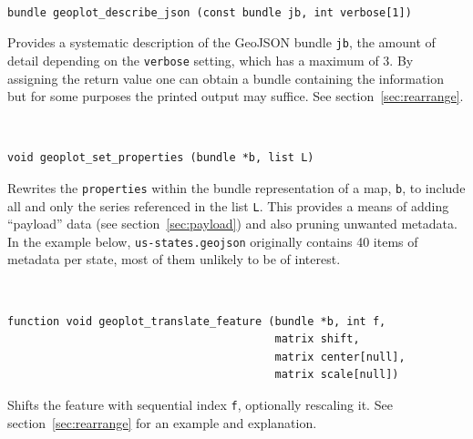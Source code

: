 \documentclass{article}
\newenvironment{funcdoc}
{\noindent\hrulefill\\[-10pt]}
{\medskip}
\begin{document}
\begin{funcdoc}
\begin{verbatim}
bundle geoplot_describe_json (const bundle jb, int verbose[1])
\end{verbatim}
  Provides a systematic description of the GeoJSON bundle \texttt{jb},
  the amount of detail depending on the \texttt{verbose} setting,
  which has a maximum of 3. By assigning the return value one can
  obtain a bundle containing the information but for some purposes the
  printed output may suffice. See section~\ref{sec:rearrange}.
\end{funcdoc}

\begin{funcdoc}
\begin{verbatim}
void geoplot_set_properties (bundle *b, list L)
\end{verbatim}
  Rewrites the \texttt{properties} within the bundle representation of
  a map, \texttt{b}, to include all and only the series referenced in
  the list \texttt{L}. This provides a means of adding ``payload''
  data (see section~\ref{sec:payload}) and also pruning unwanted
  metadata.  In the example below, \texttt{us-states.geojson}
  originally contains 40 items of metadata per state, most of them
  unlikely to be of interest.
\end{funcdoc}

\begin{funcdoc}
\begin{verbatim}
function void geoplot_translate_feature (bundle *b, int f,
                                         matrix shift,
                                         matrix center[null],
                                         matrix scale[null])
\end{verbatim}
  Shifts the feature with sequential index \texttt{f}, optionally
  rescaling it. See section~\ref{sec:rearrange} for an example and
  explanation.
\end{funcdoc}
\end{document}
